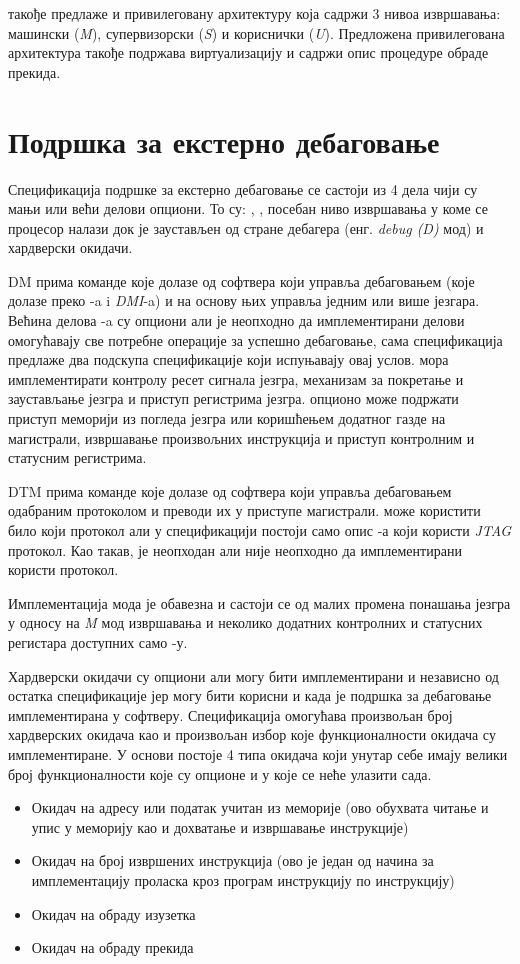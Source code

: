 такође предлаже и привилеговану архитектуру \cite{priv_spec} која садржи 3 нивоа извршавања: машински (\textit{M}), супервизорски (\textit{S}) и кориснички (\textit{U}).
Предложена привилегована архитектура такође подржава виртуализацију и садржи опис процедуре обраде прекида.

\section{Подршка за екстерно дебаговање}

Спецификација подршке за екстерно дебаговање \cite{debug_spec} се састоји из 4 дела чији су мањи или већи делови опциони.
То су: , , посебан ниво извршавања у коме се процесор налази док је заустављен од стране дебагера (енг. \textit{debug (D)} мод) и хардверски окидачи.

\acrfull{DM} прима команде које долазе од софтвера који управља дебаговањем (које долазе преко -a i \textit{\acrfull{DMI}}-a) и на основу њих управља једним или више језгара.
Већина делова -a су опциони али је неопходно да имплементирани делови омогућавају све потребне операције за успешно дебаговање, сама спецификација предлаже два подскупа спецификације који испуњавају овај услов.
 мора имплементирати контролу ресет сигнала језгра, механизам за покретање и заустављање језгра и приступ регистрима језгра.
 опционо може подржати приступ меморији из погледа језгра или коришћењем додатног газде на магистрали, извршавање произвољних инструкција и приступ контролним и статусним регистрима.

\acrfull{DTM} прима команде које долазе од софтвера који управља дебаговањем одабраним протоколом и преводи их у приступе  магистрали.
 може користити било који протокол али у спецификацији постоји само опис -а који користи \textit{\acrfull{JTAG}} протокол.
Као такав,  је неопходан али није неопходно да имплементирани  користи  протокол.

Имплементација  мода је обавезна и састоји се од малих промена понашања језгра у односу на \textit{M} мод извршавања и неколико додатних контролних и статусних регистара доступних само -у.

Хардверски окидачи су опциони али могу бити имплементирани и независно од остатка спецификације јер могу бити корисни и када је подршка за дебаговање имплементирана у софтверу.
Спецификација омогућава произвољан број хардверских окидача као и произвољан избор које функционалности окидача су имплементиране.
У основи постоје 4 типа окидача који унутар себе имају велики број функционалности које су опционе и у које се неће улазити сада.
\begin{itemize}
	\item Окидач на адресу или податак учитан из меморије (ово обухвата читање и упис у меморију као и дохватање и извршавање инструкције)
	\item Окидач на број извршених инструкција (ово је један од начина за имплементацију проласка кроз програм инструкцију по инструкцију)
	\item Окидач на обраду изузетка
	\item Окидач на обраду прекида
\end{itemize}

